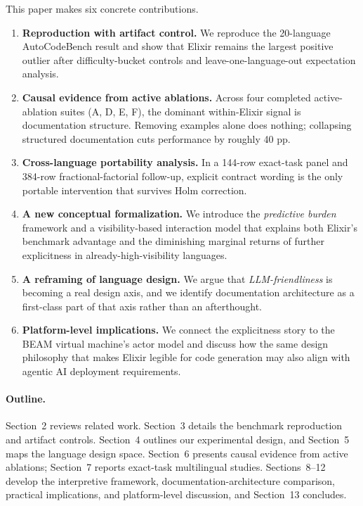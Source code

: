\documentclass[11pt]{article}
\newcommand{\acb}{AutoCodeBench}
\newcommand{\pp}{pp}
\newcommand{\elixir}{Elixir}
\begin{document}
This paper makes six concrete contributions.

\begin{enumerate}
  \item \textbf{Reproduction with artifact control.} We reproduce the 20-language \acb{} result and show that \elixir{} remains the largest positive outlier after difficulty-bucket controls and leave-one-language-out expectation analysis.
  \item \textbf{Causal evidence from active ablations.} Across four completed active-ablation suites (A, D, E, F), the dominant within-\elixir{} signal is documentation structure. Removing examples alone does nothing; collapsing structured documentation cuts performance by roughly 40 \pp.
  \item \textbf{Cross-language portability analysis.} In a 144-row exact-task panel and 384-row fractional-factorial follow-up, explicit contract wording is the only portable intervention that survives Holm correction.
  \item \textbf{A new conceptual formalization.} We introduce the \emph{predictive burden} framework and a visibility-based interaction model that explains both \elixir{}'s benchmark advantage and the diminishing marginal returns of further explicitness in already-high-visibility languages.
  \item \textbf{A reframing of language design.} We argue that \emph{LLM-friendliness} is becoming a real design axis, and we identify documentation architecture as a first-class part of that axis rather than an afterthought.
  \item \textbf{Platform-level implications.} We connect the explicitness story to the BEAM virtual machine's actor model and discuss how the same design philosophy that makes \elixir{} legible for code generation may also align with agentic AI deployment requirements.
\end{enumerate}

\paragraph{Outline.}
Section~2 reviews related work. Section~3 details the benchmark reproduction and artifact controls. Section~4 outlines our experimental design, and Section~5 maps the language design space. Section~6 presents causal evidence from active ablations; Section~7 reports exact-task multilingual studies. Sections~8--12 develop the interpretive framework, documentation-architecture comparison, practical implications, and platform-level discussion, and Section~13 concludes.
\end{document}
